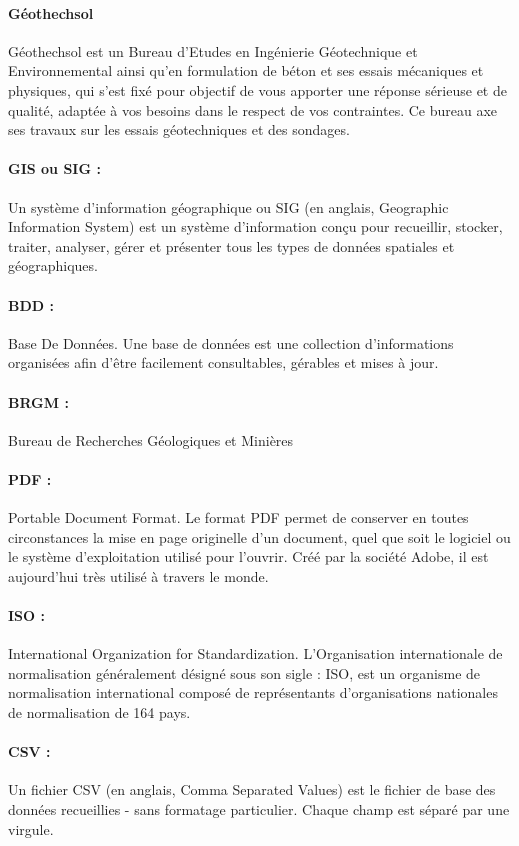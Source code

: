 \paragraph{Géothechsol}
Géothechsol est un Bureau d’Etudes 
en Ingénierie Géotechni\-que et Environnemental
ainsi qu’en formulation de béton et ses essais mécani\-ques et physiques, qui s’est
fixé pour objectif de vous apporter une réponse sérieuse et de qualité, adaptée à 
vos besoins dans le respect de vos contraintes. Ce bureau axe ses travaux sur les
essais géotechniques et des sondages.

\paragraph{GIS ou SIG :}  
Un système d'information géographique ou SIG (en anglais, Geographic 
Information System) est un système d'information conçu pour 
recueillir, stocker, traiter, analyser, gérer et présenter tous les 
types de données spatiales et géographiques. 

\paragraph{BDD :} 
Base De Données. Une base de données  est une collection d’informations organisées afin 
d’être facilement consultables, gérables et mises à jour.

\paragraph{BRGM :}
Bureau de Recherches Géologiques et Minières


\paragraph{PDF :}
Portable Document Format. Le format PDF permet de conserver en 
toutes circonstances la mise en page 
originelle d'un document, quel que soit le logiciel ou le système 
d'exploitation utilisé pour l'ouvrir. Créé par la société Adobe, 
il est aujourd'hui très utilisé à travers le monde.

\paragraph{ISO :}
International Organization for Standardization.
L'Organisation internationale de normalisation généralement désigné sous son
 sigle : ISO, est un organisme de normalisation international composé de 
 représentants d'organisations nationales de normalisation de 164 pays.


\paragraph{CSV :}
Un fichier CSV (en anglais, Comma Separated Values) est le fichier de 
base des données recueillies - sans formatage particulier. Chaque 
champ est séparé par une virgule.